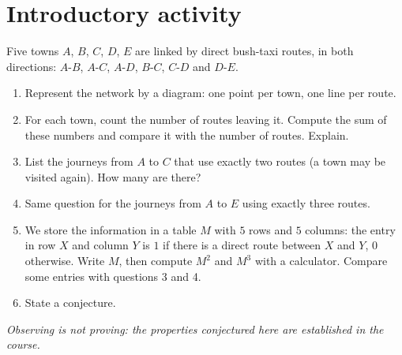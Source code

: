 \mxnewpage
\section{Introductory activity}
\begin{activity}
Five towns $A$, $B$, $C$, $D$, $E$ are linked by direct bush-taxi routes, in both directions: $A$-$B$, $A$-$C$, $A$-$D$, $B$-$C$, $C$-$D$ and $D$-$E$.
\begin{enumerate}
\item Represent the network by a diagram: one point per town, one line per route.
\item For each town, count the number of routes leaving it. Compute the sum of these numbers and compare it with the number of routes. Explain.
\item List the journeys from $A$ to $C$ that use exactly two routes (a town may be visited again). How many are there?
\item Same question for the journeys from $A$ to $E$ using exactly three routes.
\item We store the information in a table $M$ with $5$ rows and $5$ columns: the entry in row $X$ and column $Y$ is $1$ if there is a direct route between $X$ and $Y$, $0$ otherwise. Write $M$, then compute $M^2$ and $M^3$ with a calculator. Compare some entries with questions 3 and 4.
\item State a conjecture.
\end{enumerate}
\par\emph{Observing is not proving: the properties conjectured here are established in the course.}
\end{activity}
